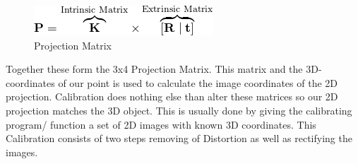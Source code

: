 \documentclass[journal,onecolumn]{IEEEtran}
\begin{document}
\begin{figure}[H]
	\centering
	\includegraphics[scale=0.7]{projectionMatrix.png}
	\captionsetup{justification=centering}
	\caption{Projection Matrix}
\end{figure}
\noindent
Together these form the 3x4 Projection Matrix. This matrix and the 3D-coordinates of our point is used to calculate the image coordinates of the 2D projection. Calibration does nothing else than alter these matrices so our 2D projection matches the 3D object. This is usually done by giving the calibrating program/ function a set of 2D images with known 3D coordinates.\newline
This Calibration consists of two steps removing of Distortion as well as rectifying the images\cite{ImageRectification}.
\end{document}
